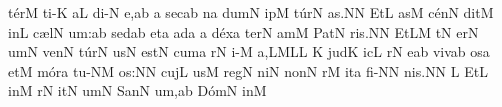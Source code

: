 \spatium
\sgn t{\'e}r\punctum M\egn
\sgn ti-\punctum K\egn
\sgn {}a{}\punctum L\egn
\spatium
\sgn d{i}-\punctum N\egn
\sgn {}e,\punctum a\augmentum b\egn
\spatium
\divisiominor
\spatium
\custos a
\lineaproxima
\sgn sec\pes ab\egn
{}n\punctum a\egn
\sgn dum\punctum N\egn
\spatium
{}ip\punctum M\egn
\sgn t{\'u}r\punctum N\egn
\sgn {}a{s.}\punctum N\augmentum N\egn
\spatium
\divisiofinalis
\spatium
\sgn {}Et\punctum L\egn
\spatium
\sgn {}as\punctum M\egn
\sgn c{\'e}n\punctum N\egn
\sgn dit\punctum M\egn
\spatium
\sgn {}in\punctum L\egn
\spatium
\sgn c{\ae}l\punctum N\egn
\sgn {}u{m:}\punctum a\augmentum b\egn
\spatium
\divisiominor
\spatium
\sgn s{e}d\pes ab\egn
\sgn {}et\punctum a\egn
\spatium
\sgn {}ad\punctum a\egn
\spatium
\custos a
\lineaproxima
\sgn d{\'e}x\punctum a\egn
\sgn ter\punctum N\egn
\sgn {}am\punctum M\egn
\spatium
\sgn P{a}t\punctum N\egn
\sgn ri{s.}\punctum N\augmentum N\egn
\spatium
\divisiofinalis
\spatium
\sgn {}Et\pes LM\egn
\spatium
\sgn {}{\'\i}t\punctum N\egn
\sgn {}er\punctum N\egn
\sgn {}um\punctum N\egn
\spatium
\sgn ven\punctum N\egn
\sgn t{\'u}r\punctum N\egn
\sgn {}us\punctum N\egn
\spatium
\sgn {}e{st}\punctum N\egn
\spatium
\sgn cum\punctum a\egn
\spatium
{}r\punctum N\egn
\sgn {}i-\punctum M\egn
\sgn {}a,\torculus LML\punctum L\egn
\spatium
\divisiominima
\spatium
\custos K
\lineaproxima
\sgn j{u}d\punctum K\egn
\sgn {}ic\punctum L\egn
{}r\punctum N\egn
\sgn {}e{}\punctum a\augmentum b\egn
\spatium
\sgn v{i}v\pes ab\egn
\sgn {}os\punctum a\egn
\spatium
\sgn {}et\punctum M\egn
\spatium
\sgn m{\'o}r\punctum a\egn
\sgn tu-\clivis NM\egn
\sgn {}o{s:}\punctum N\augmentum N\egn
\spatium
\divisiominor
\spatium
\sgn c{u}j\punctum L\egn
\sgn {}us\punctum M\egn
\spatium
\sgn r{e}g\punctum N\egn
\sgn ni{}\punctum N\egn
\spatium
\sgn non\punctum N\egn
\spatium
{}r\punctum M\egn
\sgn {}it\punctum a\egn
\spatium
\sgn f{i}-\punctum N\augmentum N\egn
\sgn ni{s.}\punctum N\augmentum N\egn
\spatium
\divisiofinalis
\spatium
\custos L
\lineaproxima
\sgn {}Et\punctum L\egn
\spatium
\sgn {}in\punctum M\egn
\spatium
{}r\punctum N\egn
\sgn {}it\punctum N\egn
\sgn {}um\punctum N\egn
\spatium
\sgn S{a}n\punctum N\egn
{}u{m,}\punctum a\augmentum b\egn
\spatium
\sgn D{\'o}m\punctum N\egn
\sgn {}in\punctum M\egn
